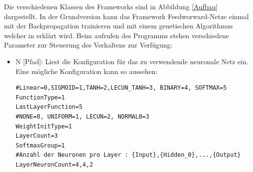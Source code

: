 \documentclass[12pt]{article}
\begin{document}
Die verschiedenen Klassen des Frameworks sind in Abbildung \ref{Aufbau} dargestellt. In der Grundversion kann das Framework Feedworward-Netze einmal mit der Backpropagation trainieren und mit einem genetischen Algorithmus welcher in \cite{Helm} erklärt wird. Beim aufrufen des Programms stehen verschiedene Parameter zur Steuerung des Verhaltens zur Verfügung:
\newpage
\begin{itemize}
\renewcommand\labelitemi{--}
\item N [Pfad]: Liest die Konfiguration für das zu verwendende neuronale Netz ein. Eine mögliche Konfiguration kann so aussehen:
\begin{lstlisting}[caption={Beispielkonfigurationsdatei für ein neuronales Netz},captionpos=b, label=NNKonf]
#Linear=0,SIGMOID=1,TANH=2,LECUN_TANH=3, BINARY=4, SOFTMAX=5
FunctionType=1
LastLayerFunction=5
#NONE=0, UNIFORM=1, LECUN=2, NORMAL0=3
WeightInitType=1
LayerCount=3
SoftmaxGroup=1
#Anzahl der Neuronen pro Layer : {Input},{Hidden_0},...,{Output}
LayerNeuronCount=4,4,2


\end{lstlisting}
\end{itemize}
\end{document}
